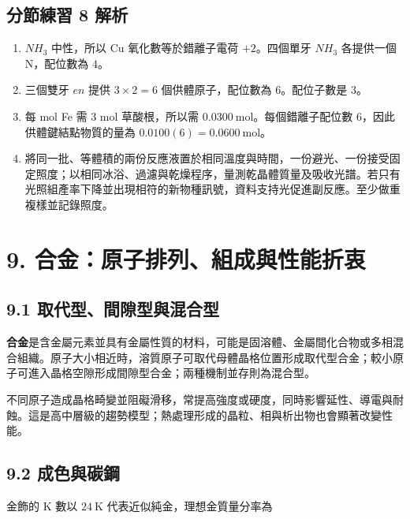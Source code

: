 \documentclass[11pt,a4paper]{article}
\providecommand{\tightlist}{%
  \setlength{\itemsep}{0pt}\setlength{\parskip}{0pt}}
\begin{document}
\subsection{分節練習 8 解析}\label{ux5206ux7bc0ux7df4ux7fd2-8-ux89e3ux6790}

\begin{enumerate}
\def\labelenumi{\arabic{enumi}.}
\tightlist
\item
  \(NH_3\) 中性，所以 Cu 氧化數等於錯離子電荷 \(+2\)。四個單牙 \(NH_3\) 各提供一個 N，配位數為 \(4\)。
\item
  三個雙牙 \(en\) 提供 \(3\times2=6\) 個供體原子，配位數為 \(6\)。配位子數是 \(3\)。
\item
  每 mol Fe 需 \(3\) mol 草酸根，所以需 \(0.0300\ \mathrm{mol}\)。每個錯離子配位數 \(6\)，因此供體鍵結點物質的量為 \(0.0100(6)=0.0600\ \mathrm{mol}\)。
\item
  將同一批、等體積的兩份反應液置於相同溫度與時間，一份避光、一份接受固定照度；以相同冰浴、過濾與乾燥程序，量測乾晶體質量及吸收光譜。若只有光照組產率下降並出現相符的新物種訊號，資料支持光促進副反應。至少做重複樣並記錄照度。
\end{enumerate}

\section{9. 合金：原子排列、組成與性能折衷}\label{ux5408ux91d1ux539fux5b50ux6392ux5217ux7d44ux6210ux8207ux6027ux80fdux6298ux8877}

\subsection{9.1 取代型、間隙型與混合型}\label{ux53d6ux4ee3ux578bux9593ux9699ux578bux8207ux6df7ux5408ux578b}

\textbf{合金}是含金屬元素並具有金屬性質的材料，可能是固溶體、金屬間化合物或多相混合組織。原子大小相近時，溶質原子可取代母體晶格位置形成取代型合金；較小原子可進入晶格空隙形成間隙型合金；兩種機制並存則為混合型。

不同原子造成晶格畸變並阻礙滑移，常提高強度或硬度，同時影響延性、導電與耐蝕。這是高中層級的趨勢模型；熱處理形成的晶粒、相與析出物也會顯著改變性能。

\subsection{9.2 成色與碳鋼}\label{ux6210ux8272ux8207ux78b3ux92fc}

金飾的 K 數以 \(24\ \mathrm{K}\) 代表近似純金，理想金質量分率為
\end{document}
